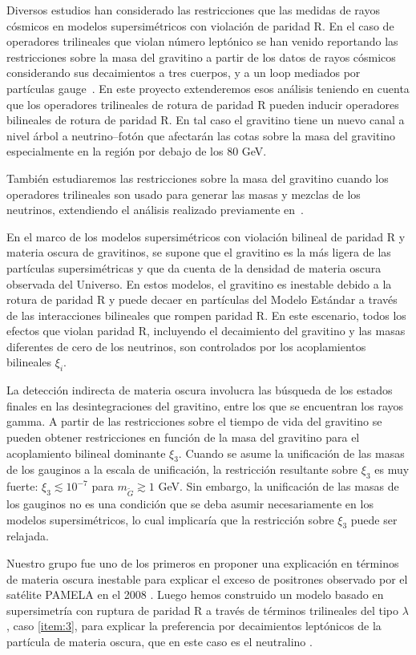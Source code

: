 \begin{gravitinodm}

  Diversos estudios han considerado las restricciones que las medidas
  de rayos cósmicos en modelos supersimétricos con violación de
  paridad R. En el caso de operadores trilineales que violan número
  leptónico se han venido reportando las restricciones sobre la masa del
  gravitino a partir de los datos de rayos cósmicos considerando sus
  decaimientos a tres cuerpos, y a un loop mediados por partículas
  gauge~\cite{}. En este proyecto extenderemos esos análisis teniendo en
  cuenta que los operadores trilineales de rotura de paridad R pueden
  inducir operadores bilineales de rotura de paridad R. En tal caso el
  gravitino tiene un nuevo canal a nivel árbol a neutrino--fotón que
  afectarán las cotas sobre la masa del gravitino especialmente en la
  región por debajo de los 80 GeV. 

  También estudiaremos las restricciones sobre la masa del gravitino
  cuando los operadores trilineales son usado para generar las masas y
  mezclas de los neutrinos, extendiendo el análisis realizado
  previamente en~\cite{}.

En el marco de los modelos supersimétricos con violación bilineal de paridad R y materia oscura de gravitinos, se supone que el gravitino es la más ligera de las partículas supersimétricas y que da cuenta de la densidad de materia oscura observada del Universo. En estos modelos, el gravitino es inestable debido a la rotura de paridad R y puede decaer en partículas del Modelo Estándar a través de las interacciones bilineales que rompen paridad R. En este escenario, todos los efectos que violan paridad R, incluyendo el decaimiento del gravitino y las masas diferentes de cero de los neutrinos, son controlados por los acoplamientos bilineales $\xi_i$. 

La detección indirecta de materia oscura involucra las búsqueda de los estados finales en las desintegraciones del gravitino, entre los que se encuentran los rayos gamma. A partir de las restricciones sobre el tiempo de vida del gravitino se pueden obtener restricciones en función de la masa del gravitino para el acoplamiento bilineal dominante $\xi_3$. Cuando se asume la unificación de las masas de los gauginos a la escala de unificación, la restricción resultante sobre $\xi_3$ es muy fuerte: $\xi_3\lesssim 10^{-7}$ para $m_{\tilde G}\gtrsim 1$ GeV.  Sin embargo, la unificación de las masas de los gauginos no es una condición que se deba asumir necesariamente en los modelos supersimétricos, lo cual implicaría que la restricción sobre $\xi_3$ puede ser relajada.

Nuestro grupo \cite{Nardi:2008ix} fue uno de los
primeros en proponer una explicación en términos de materia oscura
inestable para explicar el exceso de positrones observado por el
satélite PAMELA en el 2008 \cite{Adriani:2008zr}. Luego hemos
construido un modelo basado en supersimetría con ruptura de paridad R
a través de términos trilineales del tipo $\lambda$, caso
\ref{item:3}, para explicar la preferencia por decaimientos leptónicos
de la partícula de materia oscura, que en este caso es el
neutralino \cite{Sierra:2009zq}.
\end{gravitinodm}


